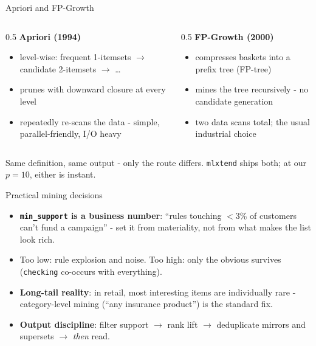 \documentclass[10pt,aspectratio=169]{beamer}
\begin{document}
\begin{frame}{Apriori and FP-Growth}
  \begin{columns}[T]
    \begin{column}{0.5\textwidth}
      \textbf{Apriori (1994)}
      \begin{itemize}\small
        \item level-wise: frequent 1-itemsets $\to$ candidate 2-itemsets
              $\to$ \ldots
        \item prunes with downward closure at every level
        \item repeatedly re-scans the data - simple, parallel-friendly,
              I/O heavy
      \end{itemize}
    \end{column}
    \begin{column}{0.5\textwidth}
      \textbf{FP-Growth (2000)}
      \begin{itemize}\small
        \item compresses baskets into a \alert{prefix tree} (FP-tree)
        \item mines the tree recursively - no candidate generation
        \item two data scans total; the usual industrial choice
      \end{itemize}
    \end{column}
  \end{columns}
  \vspace{0.7em}
  \begin{center}
    Same definition, same output - only the route differs.
    \texttt{mlxtend} ships both; at our $p = 10$, either is instant.
  \end{center}
\end{frame}

\begin{frame}{Practical mining decisions}
  \begin{itemize}
    \item \textbf{\texttt{min\_support} is a business number}: ``rules
          touching $<$3\% of customers can't fund a campaign'' - set it
          from materiality, not from what makes the list look rich.
    \item Too low: rule explosion and noise. Too high: only the obvious
          survives (\texttt{checking} co-occurs with everything).
    \item \textbf{Long-tail reality}: in retail, most interesting items
          are individually rare - category-level mining (``any insurance
          product'') is the standard fix.
    \item \textbf{Output discipline}: filter support $\to$ rank lift
          $\to$ deduplicate mirrors and supersets $\to$ \emph{then} read.
  \end{itemize}
\end{frame}
\end{document}
